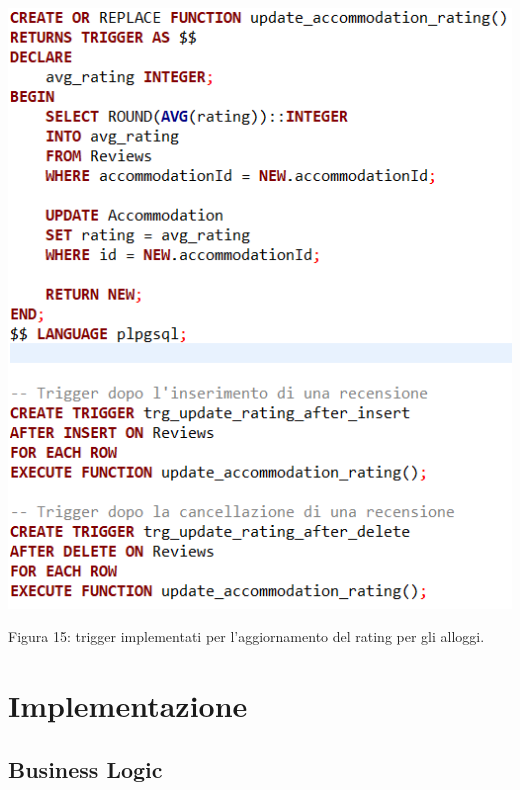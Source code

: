 \documentclass[10pt]{article}
\begin{document}
\begin{center}
\par\medskip
\includegraphics[scale=0.65]{trigger/trigger}
\par\medskip
Figura 15: trigger implementati per l'aggiornamento del rating per gli alloggi.
\par\medskip
\end{center}

\section{Implementazione}
\subsection{Business Logic}
\end{document}

